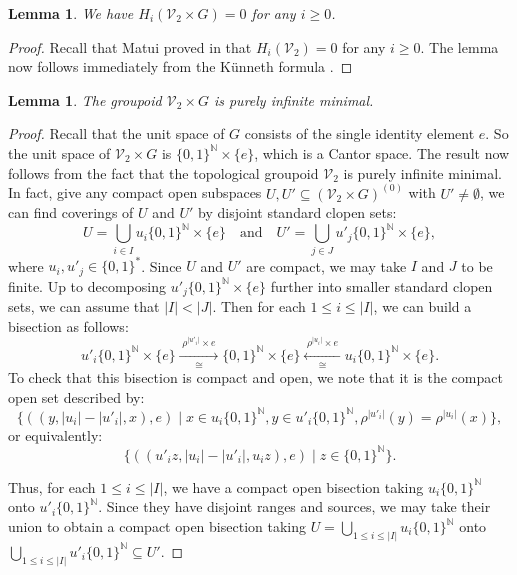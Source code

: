 \documentclass[10pt,a4paper]{amsart}
\numberwithin{equation}{section}
\numberwithin{figure}{section}
\newtheorem{lem}[thm]{Lemma}
\theoremstyle{definition}
\newcommand{\cV}{\mathcal{V}}
\newcommand{\bN}{\mathbb{N}}
\renewcommand{\geq}{\geqslant}
\renewcommand{\leq}{\leqslant}
\begin{document}
\begin{lem}
\label{lem:homology-prod-VH}
We have $H_i(\mathcal{V}_2 \times G) = 0$ for any $i\geq 0$.
\end{lem}
\begin{proof}
Recall that Matui proved in \cite[Theorem 4.14]{Matui2012} that $H_i(\mathcal{V}_2) = 0$ for any $i\geq 0$. The lemma now follows immediately from the K\"unneth formula \cite[Theorem 2.4]{Matui2016}.
\end{proof}

\begin{lem}\label{lem:minimal+comprision-VH}
The groupoid $\mathcal{V}_2 \times G$ is purely infinite minimal.
\end{lem}
\begin{proof}
Recall that the unit space of $G$ consists of the single identity element $e$. So the unit space of $\cV_2\times G$ is $\{0,1\}^{\bN} \times \{e\}$, which is a Cantor space. The result now follows from the fact that the topological groupoid $\mathcal{V}_2$ is purely infinite minimal. In fact, give any compact open subspaces $U,U' \subseteq ({\cV}_2\times G)^{(0)}$ with $U'\neq \emptyset$, we can find coverings of $U$ and $U'$ by disjoint standard clopen sets:
\[
U = \bigcup_{i\in I} u_i\{0,1\}^{\bN} \times \{e\} \quad\text{and}\quad U' = \bigcup_{j\in J} u'_j\{0,1\}^{\bN} \times \{e\},
\]
where $u_i, u'_j \in \{0,1\}^\ast$. Since $U$ and $U'$ are compact, we may take $I$ and $J$ to be finite. Up to decomposing $u'_j\{0,1\}^{\bN} \times \{e\}$ further into smaller standard clopen sets, we can assume that $\lvert I \rvert < \lvert J \rvert$. Then for each $1\leq i\leq \lvert I \rvert$, we can build a bisection as follows:
\[
u'_i\{0,1\}^{\bN} \times \{e\} \xrightarrow[\cong]{\;\rho^{\lvert u'_i \rvert} \times e\;} \{0,1\}^{\bN} \times \{e\} \xleftarrow[\cong]{\;\rho^{\lvert u_i \rvert} \times e\;} u_i\{0,1\}^{\bN} \times \{e\}.
\]
To check that this bisection is compact and open, we note that it is the compact open set described by:
\[
\{((y, \lvert u_i \rvert - \lvert u'_i \rvert , x),e ) \mid x\in u_i\{0,1\}^{\bN}, y \in u'_i\{0,1\}^{\bN}, \rho^{\lvert u'_i \rvert}(y) = \rho^{\lvert u_i \rvert}(x) \} ,
\]
or equivalently:
\[
\{ ((u'_i z , \lvert u_i \rvert - \lvert u'_i \rvert , u_i z) , e) \mid z \in \{0,1\}^\bN \} .
\]

Thus, for each $1\leq i\leq \lvert I \rvert$, we have a compact open bisection taking $u_i\{0,1\}^{\bN}$ onto $u'_i\{0,1\}^{\bN}$. Since they have disjoint ranges and sources, we may take their union to obtain a compact open bisection taking $U = \bigcup_{1\leq i\leq |I|} u_i\{0,1\}^{\bN}$ onto $\bigcup_{1\leq i\leq |I|} u'_i\{0,1\}^{\bN} \subseteq U'$.
\end{proof}
\end{document}

